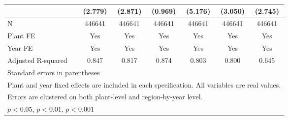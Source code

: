 \begin{table}[htbp]
\begin{tabular}{l*{6}{c}}
                &  (2.779)         &  (2.871)         &  (0.969)         &  (5.176)         &  (3.050)         &  (2.745)         \\
\midrule
N               &   446641         &   446641         &   446641         &   446641         &   446641         &   446641         \\
Plant FE        &      Yes         &      Yes         &      Yes         &      Yes         &      Yes         &      Yes         \\
Year FE         &      Yes         &      Yes         &      Yes         &      Yes         &      Yes         &      Yes         \\
Adjusted R-squared&    0.847         &    0.817         &    0.874         &    0.803         &    0.800         &    0.645         \\
\bottomrule
\multicolumn{7}{l}{\footnotesize Standard errors in parentheses}\\
\multicolumn{7}{l}{\footnotesize Plant and year fixed effects are included in each specification. All variables are real values.}\\
\multicolumn{7}{l}{\footnotesize Errors are clustered on both plant-level and region-by-year level. }\\
\multicolumn{7}{l}{\footnotesize \sym{*} \(p<0.05\), \sym{**} \(p<0.01\), \sym{***} \(p<0.001\)}\\
\end{tabular}
\end{table}
